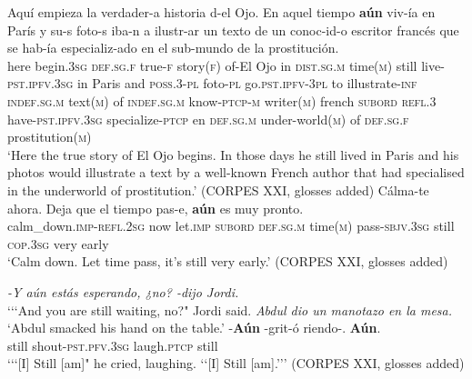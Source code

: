 \begin{exe}
	\ex
	\gll Aquí empieza la verdader-a historia d-el Ojo. En aquel tiempo \textbf{aún} viv-ía en París y su-s foto-s iba-n a ilustr-ar un texto de un conoc-id-o escritor francés que se hab-ía  especializ-ado en el sub-mundo de la prostitución.\\
	here begin.3\textsc{sg} \textsc{def}.\textsc{sg}.\textsc{f} true-\textsc{f} story(\textsc{f}) of-El Ojo in \textsc{dist}.\textsc{sg}.\textsc{m} time(\textsc{m}) still live-\textsc{pst}.\textsc{ipfv}.3\textsc{sg} in Paris and \textsc{poss}.3-\textsc{pl} foto-\textsc{pl} go.\textsc{pst}.\textsc{ipfv}-3\textsc{pl} to illustrate-\textsc{inf} \textsc{indef}.\textsc{sg}.\textsc{m} text(\textsc{m}) of \textsc{indef}.\textsc{sg}.\textsc{m} know-\textsc{ptcp}-\textsc{m} writer(\textsc{m}) french \textsc{subord} \textsc{refl}.3 have-\textsc{pst}.\textsc{ipfv}.3\textsc{sg} specialize-\textsc{ptcp} en \textsc{def}.\textsc{sg}.\textsc{m} under-world(\textsc{m}) of \textsc{def}.\textsc{sg}.\textsc{f} prostitution(\textsc{m})\\
	\glt \lq Here the true story of El Ojo begins. In those days he still lived in Paris and his photos would illustrate a text by a well-known French author that had specialised in the underworld of prostitution.' (CORPES XXI, glosses added)
	\ex 
	\gll Cálma-te ahora. Deja que el tiempo pas-e, \textbf{aún} es muy pronto.\\
calm\_down.\textsc{imp}-\textsc{refl}.2\textsc{sg} now let.\textsc{imp} \textsc{subord} \textsc{def}.\textsc{sg}.\textsc{m} time(\textsc{m}) pass-\textsc{sbjv}.3\textsc{sg} still \textsc{cop}.3\textsc{sg} very early\\
	\glt \lq Calm down. Let time pass, it's still very early.\rq{ }(CORPES XXI, glosses added)

	\ex\label{appendixSpanishAun3}
	\textit{-Y aún estás esperando, ¿no? -dijo Jordi.}\\
	\glt \lq{\lq\lq}And you are still waiting, no?" Jordi said.
	\exi{}\textit{Abdul dio un manotazo en la mesa.}\\
	\glt \lq Abdul smacked his hand on the table.'
	\exi{}\gll -\textbf{Aún} -grit-ó riendo-. \textbf{Aún}.\\
	\phantom{-}still\phantom{-} shout-\textsc{pst}.\textsc{pfv}.3\textsc{sg} laugh.\textsc{ptcp} still\\
\glt \lq {\lq\lq}[I] Still [am]" he cried, laughing. \lq\lq [I] Still [am].{\rq\rq}\rq{ }(CORPES XXI, glosses added)
\end{exe}


